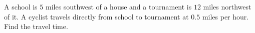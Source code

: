A school is $5$ miles southwest of a house and a tournament is $12$ miles northwest of it. A cyclist travels directly from school to tournament at $0.5$ miles per hour. Find the travel time.

